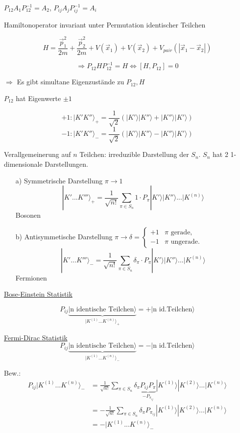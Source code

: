\(P_{12}A_1 P_{12}^{-1} = A_2\), \(P_{ij}A_jP_{ij}^{-1}=A_i\)

Hamiltonoperator invariant unter Permutation identischer Teilchen

\[H= \frac{\vec p_1^2}{2m}+ \frac{\vec p_2^2}{2m} +V(\vec x_1)+ V(\vec x_2) + V_{pair}(|\vec x_1-\vec x_2|) \]

\[\Rightarrow P_{12}HP_{12}^{-1} = H \Leftrightarrow [H,P_{12}]=0\]


\(\Rightarrow \) Es gibt simultane Eigenzustände zu \(P_{12},H\)

\(P_{12}\) hat Eigenwerte \(\pm 1\)

\[+1: |K'K''\rangle_+=\frac{1}{\sqrt{2}}(|K'\rangle|K''\rangle + |K''\rangle|K'\rangle) \]
\[-1: |K'K''\rangle_-=\frac{1}{\sqrt{2}}(|K'\rangle|K''\rangle - |K''\rangle|K'\rangle) \]

Verallgemeinerung auf \(n\) Teilchen: irreduzible Darstellung  der \(S_n\). \(S_n\) hat 2 1-dimensionale Darstellungen. 

\begin{enumerate}
\item[a)] Symmetrische Darstellung \(\pi \to 1\)
\[|K'...K'''\rangle_+ = \frac{1}{\sqrt{n!}}\sum_{\pi\in S_n}1\cdot P_\pi |K'\rangle|K''\rangle...|K^{(n)}\rangle \]
Bosonen
\item[b)] Antisymmetische Darstellung \(\pi \to \delta=\begin{cases}
  +1 & \pi \text{ gerade,}\\
  -1 & \pi \text{ ungerade.}
\end{cases}\)
\[|K'...K'''\rangle_- = \frac{1}{\sqrt{n!}}\sum_{\pi\in S_n}\delta_\pi\cdot P_\pi |K'\rangle|K''\rangle...|K^{(n)}\rangle \]
Fermionen
\end{enumerate}




\underline{Bose-Einstein Statistik}

\[P_{ij}\underbrace{|\text{n identische Teilchen}\rangle}_{|K^{(1)}...K^{(n)}\rangle_+} = +|\text{n id.Teilchen}\rangle \]

\underline{Fermi-Dirac  Statistik}
\[P_{ij}\underbrace{|\text{n identische Teilchen}\rangle}_{|K^{(1)}...K^{(n)}\rangle_-} = -|\text{n id.Teilchen}\rangle \]

Bew.: 
\begin{align}
P_{ij}|K^{(1)}...K^{(n)}\rangle_-&=\frac{1}{\sqrt{n!}}\sum_{\pi\in S_n}\delta_\pi\underbrace{P_{ij}P_\pi}_{-P_{\pi_{ij}}} |K^{(1)}\rangle|K^{(2)}\rangle...|K^{(n)}\rangle \\
&=-\frac{1}{\sqrt{n!}}\sum_{\pi\in S_n}\delta_\pi P_{\pi_{ij}} |K^{(1)}\rangle|K^{(2)}\rangle ...|K^{(n)}\rangle \\
&=-|K^{(1)} ... K^{(n)}\rangle_{-}
\end{align}



